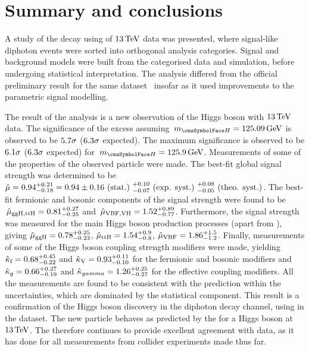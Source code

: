 \chapter{Summary and conclusions}
\label{chap:conclusions}

A study of the \Hgg decay using \thisanalysislumi\ifb of $13\,\text{Te\hspace{-.08em}V}$ data was presented, where signal-like diphoton events were sorted into orthogonal analysis categories.
Signal and background models were built from the categorised data and simulation, before undergoing statistical interpretation. The analysis differed from the official \CMS preliminary result for the same dataset~\cite{CMS-PAS-HIG-16-020} insofar as it used improvements to the parametric signal modelling. %

The result of the analysis is a new observation of the Higgs boson with $13\,\text{Te\hspace{-.08em}V}$ data. The significance of the excess assuming $\mH=125.09\GeV$ is observed to be $5.7\sigma$ ($6.3\sigma$ expected). The maximum significance is observed to be $6.1\sigma$ ($6.3\sigma$ expected) for $\mH=\bestFitGlobalMH\GeV$.
Measurements of some of the properties of the observed particle were made. The best-fit global signal strength was determined to be $\hat{\mu} = 0.94^{+0.21}_{-0.18} = 0.94 \pm 0.16 \text{~(stat.)~} ^{+0.10}_{-0.07} \text{~(exp. syst.)~} ^{+0.08}_{-0.05} \text{~(theo. syst.)}$. The best-fit fermionic and bosonic components of the signal strength were found to be $\,\hat{\mu}_{\text{ggH},\text{ttH}} = 0.81^{+0.27}_{-0.25}$ and $\,\hat{\mu}_{\text{VBF},\text{VH}} = 1.52^{+0.89}_{-0.77}$. Furthermore, the signal strength was measured for the main Higgs boson production processes (apart from \VH), giving $\hat{\mu}_{\text{ggH}} = 0.78^{+0.25}_{-0.23}$, $\hat{\mu}_{\text{ttH}} = 1.54^{+0.9}_{-0.8}$, $\hat{\mu}_{\text{VBF}} = 1.86^{+1.5}_{-1.2}$. Finally, measurements of some of the Higgs boson coupling strength modifiers were made, yielding $\hat{\kappa}_{\text{f}} = 0.68^{+0.45}_{-0.22}$ and $\hat{\kappa}_{\text{V}} = 0.93^{+0.11}_{-0.10}$ for the fermionic and bosonic modifiers and $\hat{\kappa}_{g} = 0.66^{+0.27}_{-0.19}$ and $\hat{\kappa}_{gamma} = 1.26^{+0.25}_{-0.27}$ for the effective coupling modifiers.
All the measurements are found to be consistent with the \SM prediction within the uncertainties, which are dominated by the statistical component. 
This result is a confirmation of the Higgs boson discovery in the diphoton decay channel, using in the \RunII dataset. 
The new particle behaves as predicted by the \SM for a Higgs boson at $13\,\text{Te\hspace{-.08em}V}$. The \SM therefore continues to provide excellent agreement with data, as it has done for all measurements from collider experiments made thus far.
 
